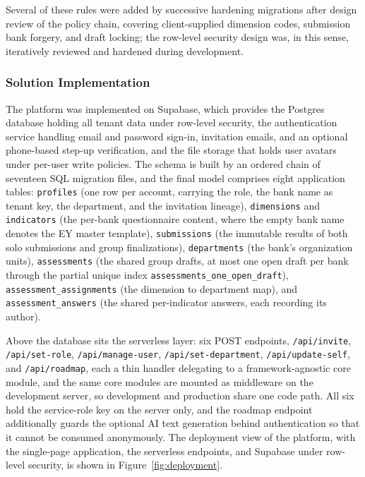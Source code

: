 Several of these rules were added by successive hardening migrations after design review of the policy chain, covering client-supplied dimension codes, submission bank forgery, and draft locking; the row-level security design was, in this sense, iteratively reviewed and hardened during development.

\subsubsection{Solution Implementation}

\begin{sloppypar}
The platform was implemented on Supabase, which provides the Postgres database holding all tenant data under row-level security, the authentication service handling email and password sign-in, invitation emails, and an optional phone-based step-up verification, and the file storage that holds user avatars under per-user write policies. The schema is built by an ordered chain of seventeen SQL migration files, and the final model comprises eight application tables: \texttt{profiles} (one row per account, carrying the role, the bank name as tenant key, the department, and the invitation lineage), \texttt{dimensions} and \texttt{indicators} (the per-bank questionnaire content, where the empty bank name denotes the EY master template), \texttt{submissions} (the immutable results of both solo submissions and group finalizations), \texttt{departments} (the bank's organization units), \texttt{assessments} (the shared group drafts, at most one open draft per bank through the partial unique index \texttt{assessments\_one\_open\_draft}), \texttt{assessment\_assignments} (the dimension to department map), and \texttt{assessment\_answers} (the shared per-indicator answers, each recording its author).
\end{sloppypar}

\begin{sloppypar}
Above the database sits the serverless layer: six POST endpoints, \texttt{/api/invite}, \texttt{/api/set-role}, \texttt{/api/manage-user}, \texttt{/api/set-department}, \texttt{/api/update-self}, and \texttt{/api/roadmap}, each a thin handler delegating to a framework-agnostic core module, and the same core modules are mounted as middleware on the development server, so development and production share one code path. All six hold the service-role key on the server only, and the roadmap endpoint additionally guards the optional AI text generation behind authentication so that it cannot be consumed anonymously. The deployment view of the platform, with the single-page application, the serverless endpoints, and Supabase under row-level security, is shown in Figure~\ref{fig:deployment}.
\end{sloppypar}

